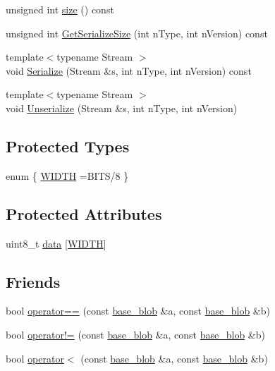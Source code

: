\begin{DoxyCompactItemize}
unsigned int \mbox{\hyperlink{classbase__blob_a00e7426a5d1ada51c635debf85f5a810}{size}} () const
\item 
unsigned int \mbox{\hyperlink{classbase__blob_ac618a70a74f5428c84d8a7f2cf080037}{Get\+Serialize\+Size}} (int n\+Type, int n\+Version) const
\item 
{\footnotesize template$<$typename Stream $>$ }\\void \mbox{\hyperlink{classbase__blob_a139e37d05d7f40a39497485a4b8301dc}{Serialize}} (Stream \&s, int n\+Type, int n\+Version) const
\item 
{\footnotesize template$<$typename Stream $>$ }\\void \mbox{\hyperlink{classbase__blob_a3d3f418c65801267e8de23d9367532c0}{Unserialize}} (Stream \&s, int n\+Type, int n\+Version)
\end{DoxyCompactItemize}
\subsection*{Protected Types}
\begin{DoxyCompactItemize}
\item 
enum \{ \mbox{\hyperlink{classbase__blob_a712871e6425fe0509412c650c8a28262a3e53605ecb8eb4c497cb23476695f0c3}{W\+I\+D\+TH}} =B\+I\+T\+S/8
 \}
\end{DoxyCompactItemize}
\subsection*{Protected Attributes}
\begin{DoxyCompactItemize}
\item 
uint8\+\_\+t \mbox{\hyperlink{classbase__blob_a667a178269121efb4ec95bd59e6a9615}{data}} \mbox{[}\mbox{\hyperlink{classbase__blob_a712871e6425fe0509412c650c8a28262a3e53605ecb8eb4c497cb23476695f0c3}{W\+I\+D\+TH}}\mbox{]}
\end{DoxyCompactItemize}
\subsection*{Friends}
\begin{DoxyCompactItemize}
\item 
bool \mbox{\hyperlink{classbase__blob_abed369be2b14c869397bb2cccc066a13}{operator==}} (const \mbox{\hyperlink{classbase__blob}{base\+\_\+blob}} \&a, const \mbox{\hyperlink{classbase__blob}{base\+\_\+blob}} \&b)
\item 
bool \mbox{\hyperlink{classbase__blob_a7f04c806d3164a5c0417bcce70be4959}{operator!=}} (const \mbox{\hyperlink{classbase__blob}{base\+\_\+blob}} \&a, const \mbox{\hyperlink{classbase__blob}{base\+\_\+blob}} \&b)
\item 
bool \mbox{\hyperlink{classbase__blob_af1ef6aa747985902964e7a5d2f8dad05}{operator$<$}} (const \mbox{\hyperlink{classbase__blob}{base\+\_\+blob}} \&a, const \mbox{\hyperlink{classbase__blob}{base\+\_\+blob}} \&b)
\end{DoxyCompactItemize}


